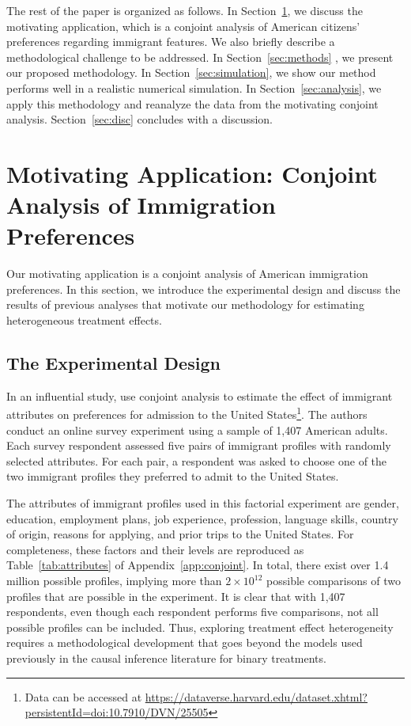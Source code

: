 The rest of the paper is organized as follows.  In
Section~\ref{sec:con}, we discuss the motivating application, which is
a conjoint analysis of American citizens' preferences regarding
immigrant features.  We also briefly describe a methodological
challenge to be addressed.  In Section~\ref{sec:methods} , we present
our proposed methodology. In Section~\ref{sec:simulation}, we show our method performs well in a realistic numerical simulation. In Section~\ref{sec:analysis}, we apply
this methodology and reanalyze the data from the motivating conjoint
analysis.  Section~\ref{sec:disc} concludes with a discussion.

\section{Motivating Application: Conjoint Analysis of Immigration
  Preferences}\label{sec:con}

Our motivating application is a conjoint analysis of American
immigration preferences.  In this section, we introduce the
experimental design and discuss the results of previous analyses that
motivate our methodology for estimating heterogeneous treatment
effects.

\subsection{The Experimental Design}

In an influential study, \cite{hainmueller2015hidden} use conjoint
analysis to estimate the effect of immigrant attributes on preferences
for admission to the United States\footnote{Data can be accessed at \url{https://dataverse.harvard.edu/dataset.xhtml?persistentId=doi:10.7910/DVN/25505}}.  The authors conduct an online
survey experiment using a sample of 1,407 American adults.  Each
survey respondent assessed five pairs of immigrant profiles with
randomly selected attributes.  For each pair, a respondent was asked
to choose one of the two immigrant profiles they preferred to admit to
the United States.

The attributes of immigrant profiles used in this factorial experiment
are gender, education, employment plans, job experience, profession,
language skills, country of origin, reasons for applying, and prior
trips to the United States.  For completeness, these factors and their
levels are reproduced as Table~\ref{tab:attributes} of
Appendix~\ref{app:conjoint}. In total, there exist
over 1.4 million possible profiles, implying more than
$2 \times 10^{12}$ possible comparisons of two profiles that are
possible in the experiment.  It is clear that with 1,407 respondents,
even though each respondent performs five comparisons, not all
possible profiles can be included.  Thus, exploring treatment effect
heterogeneity requires a methodological development that goes beyond
the models used previously in the causal inference literature for
binary treatments.
  
